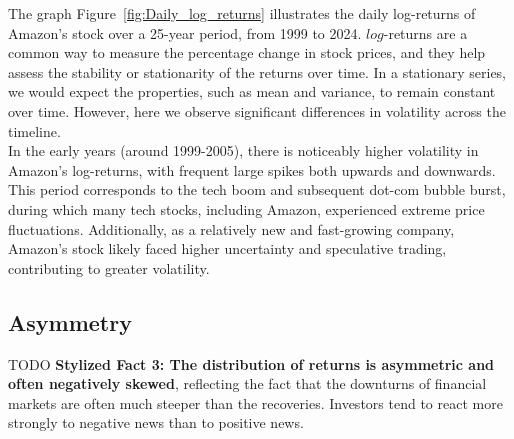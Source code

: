 \documentclass{article}
\begin{document}
\noindent The graph Figure~\ref{fig:Daily_log_returns} illustrates the daily log-returns of Amazon's stock over a 25-year period, 
from 1999 to 2024. $log$-returns are a common way to measure the percentage change in stock prices, 
and they help assess the stability or stationarity of the returns over time. In a stationary series, we would expect the properties, 
such as mean and variance, to remain constant over time. 
However, here we observe significant differences in volatility across the timeline. \\

\noindent In the early years (around 1999-2005), there is noticeably higher volatility in Amazon's log-returns, 
with frequent large spikes both upwards and downwards. This period corresponds to the tech boom and subsequent dot-com bubble burst, 
during which many tech stocks, including Amazon, experienced extreme price fluctuations. 
Additionally, as a relatively new and fast-growing company, Amazon’s stock likely faced higher uncertainty and speculative trading, 
contributing to greater volatility.

\subsection{Asymmetry}
TODO
\textbf{Stylized Fact 3: The distribution of returns is asymmetric and often negatively skewed}, reflecting the fact that the downturns of financial markets are often much steeper than the recoveries. Investors tend to react more strongly to negative news than to positive news.
\end{document}
